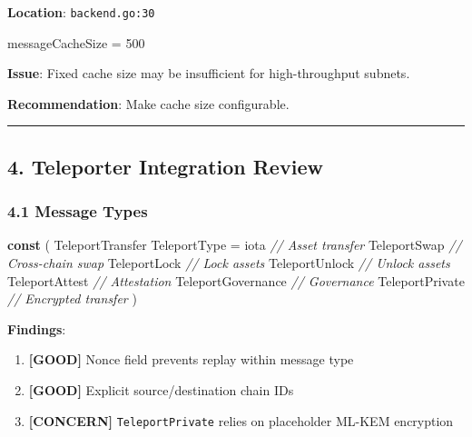 \documentclass[
]{article}
\newenvironment{Shaded}{}{}
\newcommand{\CommentTok}[1]{\textcolor[rgb]{0.38,0.63,0.69}{\textit{#1}}}
\newcommand{\DecValTok}[1]{\textcolor[rgb]{0.25,0.63,0.44}{#1}}
\newcommand{\KeywordTok}[1]{\textcolor[rgb]{0.00,0.44,0.13}{\textbf{#1}}}
\newcommand{\NormalTok}[1]{#1}
\newcommand{\OperatorTok}[1]{\textcolor[rgb]{0.40,0.40,0.40}{#1}}
\newcommand{\OtherTok}[1]{\textcolor[rgb]{0.00,0.44,0.13}{#1}}
\providecommand{\tightlist}{%
  \setlength{\itemsep}{0pt}\setlength{\parskip}{0pt}}
\begin{document}
\textbf{Location}: \texttt{backend.go:30}

\begin{Shaded}
\begin{Highlighting}[]
\NormalTok{messageCacheSize }\OperatorTok{=} \DecValTok{500}
\end{Highlighting}
\end{Shaded}

\textbf{Issue}: Fixed cache size may be insufficient for high-throughput
subnets.

\textbf{Recommendation}: Make cache size configurable.

\begin{center}\rule{0.5\linewidth}{0.5pt}\end{center}

\subsection{4. Teleporter Integration
Review}\label{4-teleporter-integration-review}

\subsubsection{4.1 Message Types}\label{41-message-types}

\begin{Shaded}
\begin{Highlighting}[]
\KeywordTok{const} \OperatorTok{(}
\NormalTok{    TeleportTransfer TeleportType }\OperatorTok{=} \OtherTok{iota}  \CommentTok{// Asset transfer}
\NormalTok{    TeleportSwap                          }\CommentTok{// Cross{-}chain swap}
\NormalTok{    TeleportLock                          }\CommentTok{// Lock assets}
\NormalTok{    TeleportUnlock                        }\CommentTok{// Unlock assets}
\NormalTok{    TeleportAttest                        }\CommentTok{// Attestation}
\NormalTok{    TeleportGovernance                    }\CommentTok{// Governance}
\NormalTok{    TeleportPrivate                       }\CommentTok{// Encrypted transfer}
\OperatorTok{)}
\end{Highlighting}
\end{Shaded}

\textbf{Findings}:

\begin{enumerate}
\def\labelenumi{\arabic{enumi}.}
\tightlist
\item
  \textbf{{[}GOOD{]}} Nonce field prevents replay within message type
\item
  \textbf{{[}GOOD{]}} Explicit source/destination chain IDs
\item
  \textbf{{[}CONCERN{]}} \texttt{TeleportPrivate} relies on placeholder
  ML-KEM encryption
\end{enumerate}
\end{document}
